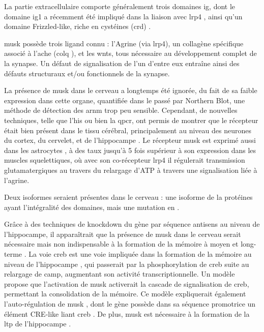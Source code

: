 	La partie extracellulaire comporte généralement trois domaines \gls{ig}, dont le domaine \gls{ig}1 a récemment été impliqué dans la liaison avec \gls{lrp}4 \cite{Zhang2011}, ainsi qu'un domaine Frizzled-like, riche en cystéines (\gls{crd}) \cite{Jing2009}.
	
	\gls{musk} possède trois ligand connu : l'Agrine (via \gls{lrp}4), un collagène spécifique associé à l'\Gls{ache} (\acrshort{colq} ), et les \Glspl{wnt}, tous nécessaire au développement complet de la synapse. Un défaut de signalisation de l'un d'entre eux entraîne ainsi des défauts structuraux et/ou fonctionnels de la synapse.
	
	La présence de \gls{musk} dans le cerveau a longtemps été ignorée, du fait de sa faible expression dans cette organe, quantifiée dans le passé par Northern Blot, une méthode de détection des \acrshort{arnm} trop peu sensible. Cependant, de nouvelles techniques, telle que l'\gls{his} ou bien la \gls{qpcr}, ont permis de montrer que le récepteur était bien présent dans le tissu cérébral, principalement au niveau des neurones du cortex, du cervelet, et de l'hippocampe \cite{Garcia-Osta2006, Ksiazek2007}. Le récepteur \gls{musk} est exprimé aussi dans les astrocytes \cite{Sun2016}, à des taux jusqu'à 5 fois supérieur à son expression dans les muscles squelettiques, où avec son co-récepteur \gls{lrp}4 il régulerait transmission glutamatergiques au travers du relargage d'ATP à travers une signalisation liée à l'agrine.
	
	 Deux isoformes seraient présentes dans le cerveau : une isoforme de la protéines ayant l'intégralité des domaines, mais une mutation en .
	
	Grâce à des techniques de knockdown du gène par séquence antisens au niveau de l'hippocampe, il apparaîtrait que la présence de \gls{musk} dans le cerveau serait nécessaire mais non indispensable à la formation de la mémoire à moyen et long-terme \cite{Garcia-Osta2006}. La voie \gls{creb} est une voie impliquée dans la formation de la mémoire au niveau de l'hippocampe \cite{Silva1998, Kandel2012,Kida2014,Ortega-Martinez2015}, qui passerait par la phosphorylation de \gls{creb} suite au relargage de \acrshort{camp}, augmentant son activité transcriptionnelle. Un modèle propose \cite{Garcia-Osta2006} que l'activation de \gls{musk} activerait la cascade de signalisation de \gls{creb}, permettant la consolidation de la mémoire. Ce modèle expliquerait également l'auto-régulation de \gls{musk} \cite{Moore2001}, dont le gène possède dans sa séquence promotrice un élément CRE-like liant \gls{creb} \cite{Kim2005}. De plus, \gls{musk} est nécessaire à la formation de la \gls{ltp} de l'hippocampe \cite{Garcia-Osta2006}.
	
